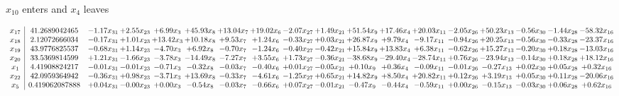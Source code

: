 \documentclass[9pt]{article}
\begin{document}
 $ x_{10} $ enters and $ x_{4} $ leaves 

 \[\begin{array}{c| c c@{\hskip 2pt} c@{\hskip 2pt} c@{\hskip 2pt} c@{\hskip 2pt} c@{\hskip 2pt} c@{\hskip 2pt} c@{\hskip 2pt} c@{\hskip 2pt} c@{\hskip 2pt} c@{\hskip 2pt} c@{\hskip 2pt} c@{\hskip 2pt} c@{\hskip 2pt} c@{\hskip 2pt} c@{\hskip 2pt} c@{\hskip 2pt} }
 x_{17}   &  41.2689042465 & -1.17 x_{31} & +  2.55 x_{23} & +  6.99 x_{3} & + 45.93 x_{8} & + 13.04 x_{7} & + 19.02 x_{6} & -2.07 x_{27} & +  1.49 x_{21} & + 51.54 x_{9} & + 17.46 x_{4} & + 20.03 x_{11} & -2.05 x_{26} & + 50.23 x_{13} & -0.56 x_{30} & -1.44 x_{28} & -58.32 x_{16}\\
 x_{18}   &  2.12072666034 & -0.17 x_{31} & +  1.01 x_{23} & + 13.42 x_{3} & + 10.18 x_{8} & +  9.53 x_{7} & +  1.24 x_{6} & -0.33 x_{27} & +  0.03 x_{21} & + 26.87 x_{9} & +  9.79 x_{4} & -9.17 x_{11} & -0.94 x_{26} & + 20.25 x_{13} & -0.56 x_{30} & -0.33 x_{28} & -23.37 x_{16}\\
 x_{19}   &  43.9776825537 & -0.68 x_{31} & +  1.14 x_{23} & -4.70 x_{3} & +  6.92 x_{8} & -0.70 x_{7} & -1.24 x_{6} & -0.40 x_{27} & -0.42 x_{21} & + 15.84 x_{9} & + 13.83 x_{4} & +  6.38 x_{11} & -0.62 x_{26} & + 15.27 x_{13} & -0.20 x_{30} & +  0.18 x_{28} & -13.03 x_{16}\\
 x_{20}   &  33.5369814599 & +  1.21 x_{31} & -1.66 x_{23} & -3.78 x_{3} & -14.49 x_{8} & -7.27 x_{7} & +  3.55 x_{6} & +  1.73 x_{27} & -0.36 x_{21} & -38.68 x_{9} & -29.40 x_{4} & -28.74 x_{11} & +  0.76 x_{26} & -23.94 x_{13} & -0.14 x_{30} & +  0.18 x_{28} & + 18.12 x_{16}\\
 x_{1}   &  4.41908824217 & -0.01 x_{31} & -0.01 x_{23} & -0.71 x_{3} & -0.32 x_{8} & -0.03 x_{7} & -0.40 x_{6} & +  0.01 x_{27} & -0.05 x_{21} & +  0.10 x_{9} & +  0.36 x_{4} & -0.09 x_{11} & -0.01 x_{26} & -0.27 x_{13} & +  0.02 x_{30} & +  0.05 x_{28} & +  0.32 x_{16}\\
 x_{22}   &  42.0959364942 & -0.36 x_{31} & +  0.98 x_{23} & -3.71 x_{3} & + 13.69 x_{8} & -0.33 x_{7} & -4.61 x_{6} & -1.25 x_{27} & +  0.65 x_{21} & + 14.82 x_{9} & +  8.50 x_{4} & + 20.82 x_{11} & +  0.12 x_{26} & +  3.19 x_{13} & +  0.05 x_{30} & +  0.11 x_{28} & -20.06 x_{16}\\
 x_{5}   &  0.419062087888 & +  0.04 x_{31} & -0.00 x_{23} & +  0.00 x_{3} & -0.54 x_{8} & -0.03 x_{7} & -0.66 x_{6} & +  0.07 x_{27} & -0.01 x_{21} & -0.47 x_{9} & -0.44 x_{4} & -0.59 x_{11} & +  0.00 x_{26} & -0.15 x_{13} & -0.03 x_{30} & +  0.06 x_{28} & +  0.62 x_{16}\\

\end{array}\]
\end{document}

